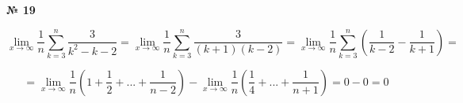 \documentclass{article}
\begin{document}
\textbf{№ 19} 

$$ \lim\limits_{x\to \infty} \frac{1}{n} \sum_{k=3}^{n} \frac{3}{k^2-k-2}
= \lim\limits_{x\to \infty} \frac{1}{n} \sum_{k=3}^{n} \frac{3}{(k+1)(k-2)}
= \lim\limits_{x\to \infty} \frac{1}{n} \sum_{k=3}^{n} \left( \frac{1}{k-2} - \frac{1}{k+1} \right)
= $$

$$ = \lim\limits_{x\to \infty} \frac{1}{n} \left( 1+\frac{1}{2}+ ... + \frac{1}{n-2} \right) - \lim\limits_{x\to \infty} \frac{1}{n} \left( \frac{1}{4}+ ... + \frac{1}{n+1} \right)
= 0 - 0 
= 0 $$
\end{document}
